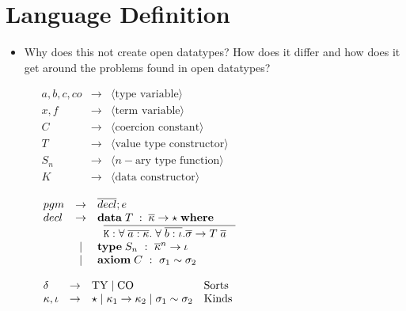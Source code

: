 \section{Language Definition}
\label{sec:langdef}
\begin{itemize}
  \item Why does this not create open datatypes? How does it differ and how
  does it get around the problems found in open datatypes?
\end{itemize}

{\begin{figure}[h]
\vspace{2mm}

$
\begin{array}{lcl}
  a,b,c,co & \to & \langle \textrm{type variable} \rangle \\
  x,f & \to & \langle \textrm{term variable} \rangle \\
  C & \to & \langle \textrm{coercion constant} \rangle \\
  T & \to & \langle \textrm{value type constructor} \rangle \\
  S_n & \to & \langle n-\textrm{ary type function} \rangle \\
  K & \to & \langle \textrm{data constructor} \rangle
\end{array}
$

\vspace{5mm}
\vspace{2mm}

$
\begin{array}{lcl}
  pgm & \to & \overline{decl}; e \\
  decl & \to & \mathbf{data}\;{T\; : \; \overline{\kappa} \to \star \;\mathbf{where}\;} \\
  & & \;\; \overline{{\tt K} : \forall\; \overline{a:\kappa}.\;
  \forall\;\overline{b : \iota}. \overline{\sigma} \to T\; \overline{a}
       \;\;\;}  \\
  & \;|\; & \mathbf{type}\; S_n ~:~ \overline{\kappa}^n \to \iota \\
  & \;|\; & \mathbf{axiom}\; C ~:~ \sigma_1 \sim \sigma_2
\end{array}
$

\vspace{5mm}
\vspace{2mm}

$
\begin{array}{lcll}
  \delta & \to & \textrm{TY} \;|\; \textrm{CO} & \textrm{Sorts} \\
  \kappa, \iota & \to & 
    \star \;|\; \kappa_1 \to \kappa_2 \;|\; \sigma_1 \sim \sigma_2 & \textrm{Kinds}
\end{array}
$


\end{figure}}

